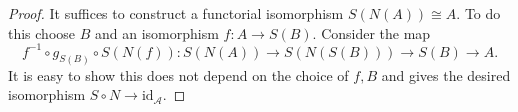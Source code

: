 \documentclass{stacks-project}
\theoremstyle{plain}
\theoremstyle{definition}
\theoremstyle{remark}
\numberwithin{equation}{subsection}
\begin{document}
\begin{proof}
It suffices to construct a functorial
isomorphism $S(N(A)) \cong A$. To do this
choose $B$ and an isomorphism $f : A  \to S(B)$.
Consider the map
$$
f^{-1} \circ g_{S(B)} \circ S(N(f)) :
S(N(A)) \to S(N(S(B))) \to S(B) \to A.
$$
It is easy to show this does not depend on
the choice of $f, B$ and gives the desired
isomorphism $S \circ N \to \text{id}_\mathcal{A}$.
\end{proof}
\end{document}
